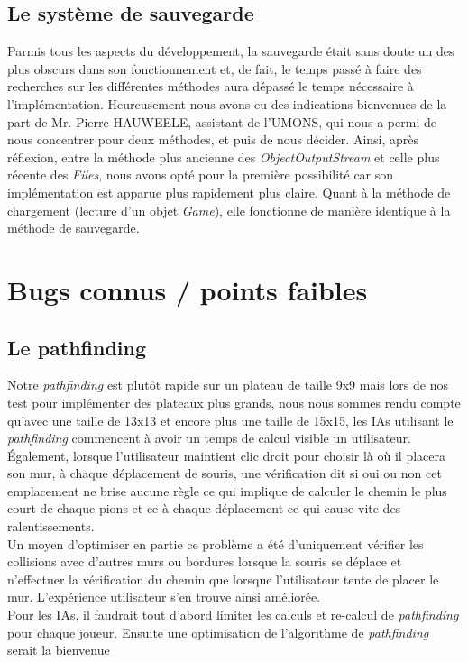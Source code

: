 \documentclass[a4paper, 12pt]{article}
\begin{document}
\subsection{Le système de sauvegarde}
Parmis tous les aspects du développement, la sauvegarde était sans doute un des plus obscurs dans son fonctionnement et, de fait, le temps passé à faire des recherches sur les différentes méthodes aura dépassé le temps nécessaire à l’implémentation. Heureusement nous avons eu des indications bienvenues de la part de Mr. Pierre HAUWEELE, assistant de l’UMONS, qui nous a permi de nous concentrer pour deux méthodes, et puis de nous décider. Ainsi, après réflexion, entre la méthode plus ancienne des \textit{ObjectOutputStream} et celle plus récente des \textit{Files}, nous avons opté pour la première possibilité car son implémentation est apparue plus rapidement plus claire. Quant à la méthode de chargement (lecture d’un objet \textit{Game}), elle fonctionne de manière identique à la méthode de sauvegarde.




\section{Bugs connus / points faibles}

\subsection{Le pathfinding}
Notre \textit{pathfinding} est plutôt rapide sur un plateau de taille 9x9 mais lors de nos test pour implémenter des plateaux plus grands, nous nous sommes rendu compte qu'avec une taille de 13x13 et encore plus une taille de 15x15, les IAs utilisant le \textit{pathfinding} commencent à avoir un temps de calcul visible un utilisateur. Également, lorsque l'utilisateur maintient clic droit pour choisir là où il placera son mur, à chaque déplacement de souris, une vérification dit si oui ou non cet emplacement ne brise aucune règle ce qui implique de calculer le chemin le plus court de chaque pions et ce à chaque déplacement ce qui cause vite des ralentissements. \\

Un moyen d'optimiser en partie ce problème a été d'uniquement vérifier les collisions avec d'autres murs ou bordures lorsque la souris se déplace et n'effectuer la vérification du chemin que lorsque l'utilisateur tente de placer le mur. L'expérience utilisateur s'en trouve ainsi améliorée. \\
Pour les IAs, il faudrait tout d'abord limiter les calculs et re-calcul  de \textit{pathfinding} pour chaque joueur. Ensuite une optimisation de l'algorithme de \textit{pathfinding} serait la bienvenue
\end{document}
